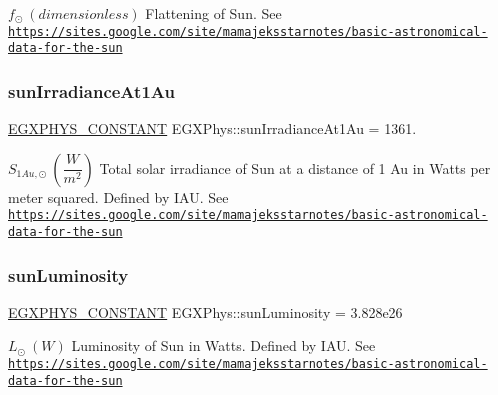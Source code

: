 $f_{\odot} \ (dimensionless)$ Flattening of Sun. See \href{https://sites.google.com/site/mamajeksstarnotes/basic-astronomical-data-for-the-sun}{\tt https\+://sites.\+google.\+com/site/mamajeksstarnotes/basic-\/astronomical-\/data-\/for-\/the-\/sun} \mbox{\label{group___e_g_x_phys-_constants-_astrophysics-_solar_system-_sun-_bulk_ga7632e3eda212f81ae257daab783a1a3f}} 
\subsubsection{\texorpdfstring{sun\+Irradiance\+At1\+Au}{sunIrradianceAt1Au}}
{\footnotesize\ttfamily \mbox{\hyperlink{group___e_g_x_phys-_constants-_macros_ga76980d288494ce1714c9ac68a95ba702}{E\+G\+X\+P\+H\+Y\+S\+\_\+\+C\+O\+N\+S\+T\+A\+NT}} E\+G\+X\+Phys\+::sun\+Irradiance\+At1\+Au = 1361.}

$ S_{1Au,\odot} \ (\dfrac{W}{m^2})$ Total solar irradiance of Sun at a distance of 1 Au in Watts per meter squared. Defined by I\+AU. See \href{https://sites.google.com/site/mamajeksstarnotes/basic-astronomical-data-for-the-sun}{\tt https\+://sites.\+google.\+com/site/mamajeksstarnotes/basic-\/astronomical-\/data-\/for-\/the-\/sun} \mbox{\label{group___e_g_x_phys-_constants-_astrophysics-_solar_system-_sun-_bulk_gaac188526cc9b051a26372e1a3b5b66b7}} 
\subsubsection{\texorpdfstring{sun\+Luminosity}{sunLuminosity}}
{\footnotesize\ttfamily \mbox{\hyperlink{group___e_g_x_phys-_constants-_macros_ga76980d288494ce1714c9ac68a95ba702}{E\+G\+X\+P\+H\+Y\+S\+\_\+\+C\+O\+N\+S\+T\+A\+NT}} E\+G\+X\+Phys\+::sun\+Luminosity = 3.\+828e26}

$ L_{\odot} \ (W)$ Luminosity of Sun in Watts. Defined by I\+AU. See \href{https://sites.google.com/site/mamajeksstarnotes/basic-astronomical-data-for-the-sun}{\tt https\+://sites.\+google.\+com/site/mamajeksstarnotes/basic-\/astronomical-\/data-\/for-\/the-\/sun} \mbox{\label{group___e_g_x_phys-_constants-_astrophysics-_solar_system-_sun-_bulk_ga4b0d14718fcf75def83eec7f17d86268}} 
